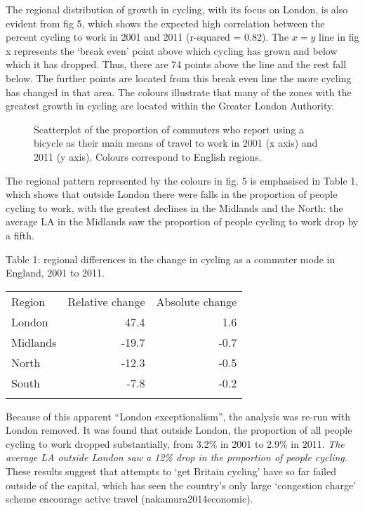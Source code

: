 The regional distribution of growth in cycling, with its focus on
London, is also evident from fig 5, which shows the expected high
correlation between the percent cycling to work in 2001 and 2011
(r-squared = 0.82). The $x = y$ line in fig x represents the `break
even' point above which cycling has grown and below which it has
dropped. Thus, there are 74 points above the line and the rest fall
below. The further points are located from this break even line the more
cycling has changed in that area. The colours illustrate that many of
the zones with the greatest growth in cycling are located within the
Greater London Authority.

\begin{figure}[htbp]
\centering
\caption{Scatterplot of the proportion of commuters who report using a
bicycle as their main means of travel to work in 2001 (x axis) and 2011
(y axis). Colours correspond to English regions.}
\end{figure}

The regional pattern represented by the colours in fig. 5 is emphasised
in Table 1, which shows that outside London there were falls in the
proportion of people cycling to work, with the greatest declines in the
Midlands and the North: the average LA in the Midlands saw the
proportion of people cycling to work drop by a fifth.

Table 1: regional differences in the change in cycling as a commuter
mode in England, 2001 to 2011.

\begin{longtable}[c]{@{}lrr@{}}
\toprule\addlinespace
Region & Relative change & Absolute change
\\\addlinespace
\midrule\endhead
London & 47.4 & 1.6
\\\addlinespace
Midlands & -19.7 & -0.7
\\\addlinespace
North & -12.3 & -0.5
\\\addlinespace
South & -7.8 & -0.2
\\\addlinespace
\bottomrule
\end{longtable}

Because of this apparent ``London exceptionalism'', the analysis was
re-run with London removed. It was found that outside London, the
proportion of all people cycling to work dropped substantially, from
3.2\% in 2001 to 2.9\% in 2011. \emph{The average LA outside London saw
a 12\% drop in the proportion of people cycling}. These results suggest
that attempts to `get Britain cycling' have so far failed outside of the
capital, which has seen the country's only large `congestion charge'
scheme encourage active travel (nakamura2014economic).

